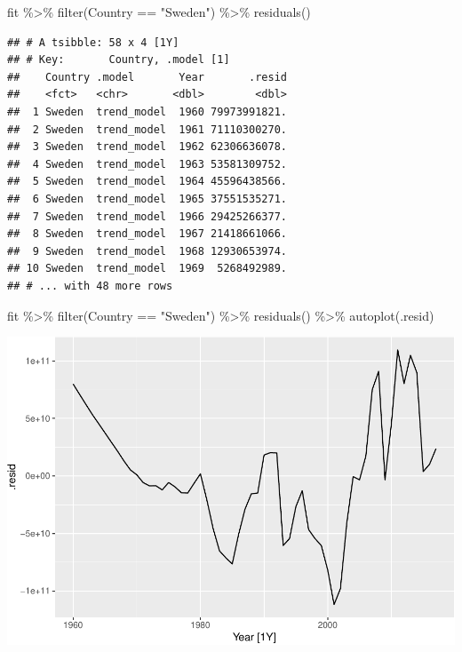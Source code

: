 \documentclass[
]{book}
\newenvironment{Shaded}{\begin{snugshade}}{\end{snugshade}}
\newcommand{\FunctionTok}[1]{\textcolor[rgb]{0.00,0.00,0.00}{#1}}
\newcommand{\NormalTok}[1]{#1}
\newcommand{\SpecialCharTok}[1]{\textcolor[rgb]{0.00,0.00,0.00}{#1}}
\newcommand{\StringTok}[1]{\textcolor[rgb]{0.31,0.60,0.02}{#1}}
\begin{document}
\begin{Shaded}
\begin{Highlighting}[]
\NormalTok{fit }\SpecialCharTok{\%\textgreater{}\%} \FunctionTok{filter}\NormalTok{(Country }\SpecialCharTok{==} \StringTok{"Sweden"}\NormalTok{) }\SpecialCharTok{\%\textgreater{}\%} \FunctionTok{residuals}\NormalTok{()}
\end{Highlighting}
\end{Shaded}

\begin{verbatim}
## # A tsibble: 58 x 4 [1Y]
## # Key:       Country, .model [1]
##    Country .model       Year       .resid
##    <fct>   <chr>       <dbl>        <dbl>
##  1 Sweden  trend_model  1960 79973991821.
##  2 Sweden  trend_model  1961 71110300270.
##  3 Sweden  trend_model  1962 62306636078.
##  4 Sweden  trend_model  1963 53581309752.
##  5 Sweden  trend_model  1964 45596438566.
##  6 Sweden  trend_model  1965 37551535271.
##  7 Sweden  trend_model  1966 29425266377.
##  8 Sweden  trend_model  1967 21418661066.
##  9 Sweden  trend_model  1968 12930653974.
## 10 Sweden  trend_model  1969  5268492989.
## # ... with 48 more rows
\end{verbatim}

\begin{Shaded}
\begin{Highlighting}[]
\NormalTok{fit }\SpecialCharTok{\%\textgreater{}\%} \FunctionTok{filter}\NormalTok{(Country }\SpecialCharTok{==} \StringTok{"Sweden"}\NormalTok{) }\SpecialCharTok{\%\textgreater{}\%} \FunctionTok{residuals}\NormalTok{() }\SpecialCharTok{\%\textgreater{}\%} \FunctionTok{autoplot}\NormalTok{(.resid)}
\end{Highlighting}
\end{Shaded}

\includegraphics{graphics/unnamed-chunk-64-1.pdf}
\end{document}
